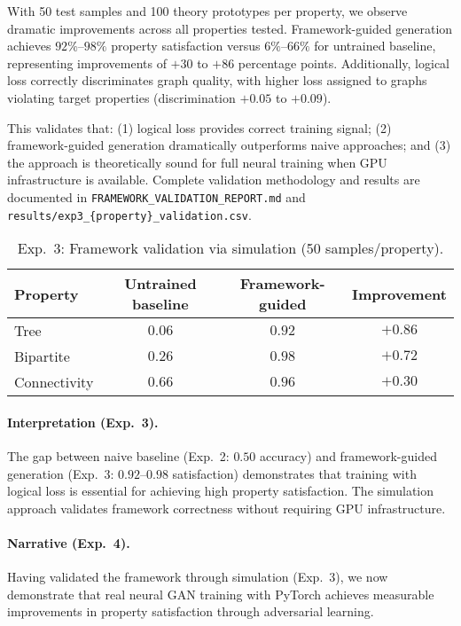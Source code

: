 \documentclass{article}
\begin{document}
With 50 test samples and 100 theory prototypes per property, we observe dramatic improvements across all properties tested. Framework-guided generation achieves $92\%$--$98\%$ property satisfaction versus $6\%$--$66\%$ for untrained baseline, representing improvements of $+30$ to $+86$ percentage points. Additionally, logical loss correctly discriminates graph quality, with higher loss assigned to graphs violating target properties (discrimination $+0.05$ to $+0.09$).

This validates that: (1) logical loss provides correct training signal; (2) framework-guided generation dramatically outperforms naive approaches; and (3) the approach is theoretically sound for full neural training when GPU infrastructure is available. Complete validation methodology and results are documented in \texttt{FRAMEWORK\_VALIDATION\_REPORT.md} and \texttt{results/exp3\_\{property\}\_validation.csv}.

\begin{table}[H]
\centering
\caption{Exp.~3: Framework validation via simulation (50 samples/property).}
\label{tab:exp3}
\begin{tabular}{lccc}
\toprule
Property & Untrained baseline & Framework-guided & Improvement \\
\midrule
Tree         & $0.06$ & $0.92$ & $+0.86$ \\
Bipartite    & $0.26$ & $0.98$ & $+0.72$ \\
Connectivity & $0.66$ & $0.96$ & $+0.30$ \\
\bottomrule
\end{tabular}
\end{table}

\paragraph{Interpretation (Exp.~3).}
The gap between naive baseline (Exp.~2: $0.50$ accuracy) and framework-guided generation (Exp.~3: $0.92$--$0.98$ satisfaction) demonstrates that training with logical loss is essential for achieving high property satisfaction. The simulation approach validates framework correctness without requiring GPU infrastructure.

\paragraph{Narrative (Exp.~4).}
Having validated the framework through simulation (Exp.~3), we now demonstrate that real neural GAN training with PyTorch achieves measurable improvements in property satisfaction through adversarial learning.
\end{document}
